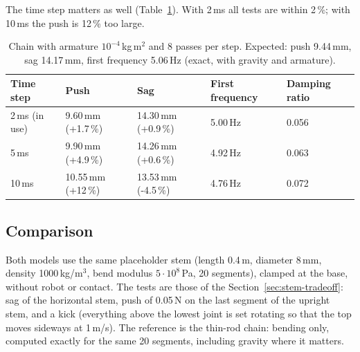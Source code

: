 The time step matters as well (Table~\ref{tab:chain-dt}). With 2\,ms all tests are within 2\,\%; with 10\,ms
the push is 12\,\% too large.

\begin{table}[h]
  \centering
  \caption{Chain with armature $10^{-4}$\,kg\,m$^2$ and 8 passes per step. Expected: push 9.44\,mm,
           sag 14.17\,mm, first frequency 5.06\,Hz (exact, with gravity and armature).}
  \label{tab:chain-dt}
  \begin{tabular}{lllll}
    \toprule
    Time step & Push & Sag & First frequency & Damping ratio \\
    \midrule
    2\,ms (in use) & 9.60\,mm (+1.7\,\%) & 14.30\,mm (+0.9\,\%) & 5.00\,Hz & 0.056 \\
    5\,ms          & 9.90\,mm (+4.9\,\%) & 14.26\,mm (+0.6\,\%) & 4.92\,Hz & 0.063 \\
    10\,ms         & 10.55\,mm (+12\,\%) & 13.53\,mm (-4.5\,\%) & 4.76\,Hz & 0.072 \\
    \bottomrule
  \end{tabular}
\end{table}

\subsection{Comparison}

Both models use the same placeholder stem (length 0.4\,m, diameter 8\,mm, density 1000\,kg/m$^3$, bend modulus
$5\cdot10^{8}$\,Pa, 20 segments), clamped at the base, without robot or contact. The tests are those of the
Section~\ref{sec:stem-tradeoff}: sag of the horizontal stem, push of 0.05\,N on the last segment of the upright stem, and a
kick (everything above the lowest joint is set rotating so that the top moves sideways at 1\,m/s). The reference
is the thin-rod chain: bending only, computed exactly for the same 20 segments, including gravity where it
matters.

